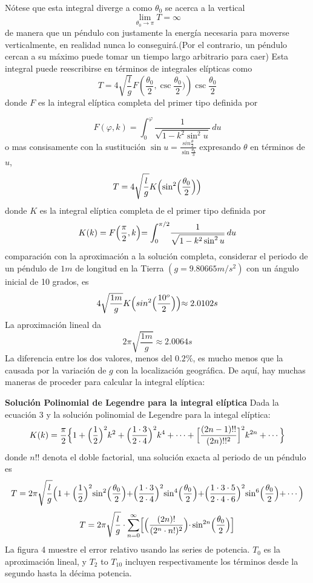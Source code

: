 \documentclass[12pt]{article}
\begin{document}
Nótese que esta integral diverge a como $\theta_0$ se acerca a la vertical
$$\lim_{\theta_0 \to \pi}T=\infty$$
de manera que un péndulo con justamente la energía necesaria para moverse verticalmente, en realidad nunca lo conseguirá.(Por el contrario, un péndulo cercan a su máximo puede tomar un tiempo largo arbitrario para caer)
Esta integral puede reescribirse en términos de integrales elípticas como
$$T=4\sqrt{\frac{l}{g}}F\left (\frac{\theta_0}{2},\csc\frac{\theta_0}{2})\right)\csc \frac{\theta_0}{2}$$
donde $F$ es la integral elíptica completa del primer tipo definida por

$$F(\varphi,k)=\int_{0}^{\varphi}\! \frac{1}{\sqrt{1-k^2\sin^2u}} \, du $$
o mas consisamente con la sustitución $\sin u=\frac{sin\frac{\theta}{2}}{\sin \frac{\theta_0}{3}}$ expresando $\theta$ en términos de $u$,
\begin{equation}
T=4\sqrt{\frac{l}{g}}K \Bigl(\sin^2\Bigl(\frac{\theta_0}{2}\Bigl)\Bigl)
\end{equation}
donde $K$ es la integral elíptica completa de el primer tipo definida por
$$K(k)=F\Bigl(\frac{\pi}{2},k \Bigl)=\int_{0}^{\pi/2} \! \frac{1}{\sqrt{1-k^2\sin^2u}} \, du$$
 comparación con la aproximación a la solución completa, considerar el periodo de un péndulo de $1m$ de longitud en la Tierra $(g=9.80665m/s^2)$ con un ángulo inicial de 10 grados, es
 $$4\sqrt{\frac{1m}{g}}K \Bigl(sin^2 \Bigl( \frac{10^o}{2}\Bigl)\Bigl)\approx 2.0102s$$
La aproximación lineal da 
$$2\pi\sqrt{\frac{1m}{g}}\approx 2.0064s$$
La diferencia entre los dos valores, menos del $0.2\%$, es mucho menos que la causada por la variación de $g$ con la localización geográfica. De aquí, hay muchas maneras de proceder para calcular la integral elíptica:

\textbf{Solución Polinomial de Legendre para la integral elíptica}
Dada la ecuación 3 y la solución polinomial de Legendre para la integal elíptica:
$$K(k)=\frac{\pi}{2}\Bigl\{1+\Bigl(\frac{1}{2}\Bigl)^2k^2+\Bigl(\frac{1\cdot 3}{2\cdot 4}\Bigl)^2k^4+ \cdots +\Bigl[\frac{(2n-1)!!}{(2n)!!^2}\Bigl]^2k^{2n}+\cdots\Bigl\}$$
donde $n!!$ denota el doble factorial, una solución exacta al periodo de un péndulo es
$$T=2\pi\sqrt{\frac{l}{g}}\Bigl(1+\Bigl(\frac{1}{2}\Bigl)^2\sin^2\Bigl(\frac{\theta_0}{2}\Bigl)+\Bigl(\frac{1\cdot 3}{2\cdot 4}\Bigl)^2\sin^4\Bigl(\frac{\theta_0}{2}\Bigl)+\Bigl(\frac{1 \cdot 3 \cdot 5}{2 \cdot 4 \cdot 6}\Bigl)^2 \sin^6\Bigl(\frac{\theta_0}{2}\Bigl)+\cdots\Bigl)$$
$$T=2\pi\sqrt{\frac{l}{g}}\cdot\sum_{n=0}^{\infty}\Bigl[\Big(\frac{(2n)!}{(2^n \cdot n!)^2}\Bigl)\cdot \sin^{2n}\Bigl(\frac{\theta_0}{2}\Bigl)\Bigl]$$
La figura 4 muestre el error relativo usando las series de potencia. $T_0$ es la aproximación lineal, y $T_2$ to $T_{10}$ incluyen respectivamente los términos desde la segundo hasta la décima potencia.
\end{document}
